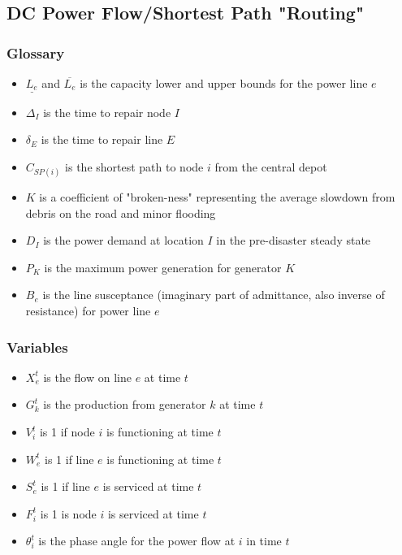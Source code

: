 \documentclass{article}
\begin{document}
	\subsection{DC Power Flow/Shortest Path "Routing"}	
	\subsubsection{Glossary}
	\begin{itemize}
		\item $\underline{L_e}$ and $\overline{L_e}$ is the capacity lower and upper bounds for the power line $e$
		\item $\Delta_{I}$ is the time to repair node $I$
		\item $\delta_{E}$ is the time to repair line $E$
		\item $C_{SP(i)}$ is the shortest path to node $i$ from the central depot
		\item $K$ is a coefficient of "broken-ness" representing the average slowdown from debris on the road and minor flooding
		\item $D_I$ is the power demand at location $I$ in the pre-disaster steady state
		\item $P_K$ is the maximum power generation for generator $K$
		\item $B_e$ is the line susceptance (imaginary part of admittance, also inverse of resistance) for power line $e$
	\end{itemize}
	\subsubsection{Variables}
	\begin{itemize}
		
		\item $X_{e}^{t}$ is the flow on line $e$ at time $t$
		\item $G_{k}^t$ is the production from generator $k$ at time $t$
		\item $V_i^t$ is 1 if node $i$ is functioning at time $t$
		\item $W_{e}^t$ is 1 if line $e$ is functioning at time $t$
		\item $S_{e}^t$ is 1 if line $e$ is serviced at time $t$
		\item $F_i^t$ is 1 is node $i$ is serviced at time $t$ 
		\item $\theta_i^t$ is the phase angle for the power flow at $i$ in time $t$
		
	\end{itemize}
\end{document}
